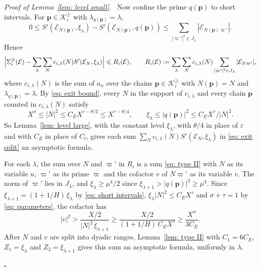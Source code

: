 \documentclass{article}
\numberwithin{equation}{section}
\newenvironment{proof}[1][Proof]{\par\medskip\noindent\textit{#1.}\ }{\hfill$\square$\par\medskip}
\newcommand{\Le}{\leqslant}
\newcommand{\Ge}{\geqslant}
\begin{document}
\begin{proof}[Proof of Lemma~\ref{lem: level small}]
Now confine the prime $q(\boldsymbol{p})$ to short intervals. For $\boldsymbol{p} \in \mathcal{K}^{\Ge}_i$ with $\lambda_{q(\boldsymbol{p})} = \lambda$,
\begin{equation*}
0 \Le S'(\mathcal{E}_{N(\boldsymbol{p})}, \xi_\lambda) - S'(\mathcal{E}_{N(\boldsymbol{p})}, q(\boldsymbol{p})) \Le \sum_{|\varpi'|^2 \in J_\lambda} |\mathcal{E}_{N(\boldsymbol{p})\varpi'}|.
\end{equation*} Hence
\begin{equation}
\label{eq: exit split}
\Bigl| \Sigma^{\Ge}_i(\mathcal{E}) - \sum_\lambda \sum_N c_{i,\lambda}(N) S'(\mathcal{E}_N, \xi_\lambda) \Bigr| \Le R_i(\mathcal{E}), \qquad R_i(\mathcal{E}) := \sum_\lambda \sum_N c_{i,\lambda}(N) \sum_{|\varpi'|^2 \in J_\lambda} |\mathcal{E}_{N\varpi'}|,
\end{equation}
where $c_{i,\lambda}(N)$ is the sum of $a_n$ over the chains $\boldsymbol{p} \in \mathcal{K}^{\Ge}_i$ with $N(\boldsymbol{p}) = N$ and $\lambda_{q(\boldsymbol{p})} = \lambda$. By \eqref{eq: exit bound}, every $N$ in the support of $c_{i,\lambda}$ and every chain $\boldsymbol{p}$ counted in $c_{i,\lambda}(N)$ satisfy
\begin{equation*}
X^{\sigma} \Le |N|^2 \Le C_E X^{\tau - \theta/2} \Le X^{\tau - \theta/4}, \qquad \xi_\lambda \Le |q(\boldsymbol{p})|^2 \Le C_E X^{\tau}/|N|^2.
\end{equation*} So Lemma~\ref{lem: level large}, with the constant level $\xi_\lambda$, with $\theta/4$ in place of $\varepsilon$ and with $C_E$ in place of $C_l$, gives each sum $\sum_N c_{i,\lambda}(N) S'(\mathcal{E}_N, \xi_\lambda)$ in \eqref{eq: exit split} an asymptotic formula.

For each $\lambda$, the sum over $N$ and $\varpi'$ in $R_i$ is a sum \eqref{eq: type II} with $N$ as its variable $u$, $\varpi'$ as its prime $\varpi$ and the cofactor $v$ of $N\varpi'$ as its variable $v$. The norm of $\varpi'$ lies in $J_\lambda$, and $\xi_\lambda \Ge \mu^4/2$ since $\xi_{\lambda+1} > |q(\boldsymbol{p})|^2 \Ge \mu^4$. Since $\xi_{\lambda+1} = (1 + 1/H)\, \xi_\lambda$ by \eqref{eq: short intervals}, $\xi_\lambda |N|^2 \Le C_E X^{\tau}$ and $\sigma + \tau = 1$ by \eqref{eq: parameters}, the cofactor has
\begin{equation*}
|v|^2 > \frac{X/2}{|N|^2\, \xi_{\lambda+1}} \Ge \frac{X/2}{(1 + 1/H)\, C_E X^{\tau}} \Ge \frac{X^{\sigma}}{3C_E}.
\end{equation*} After $N$ and $v$ are split into dyadic ranges, Lemma~\ref{lem: type II} with $C_1 = 6C_E$, $Z_1 = \xi_\lambda$ and $Z_2 = \xi_{\lambda+1}$ gives this sum an asymptotic formula, uniformly in $\lambda$.


\end{proof}
\end{document}
